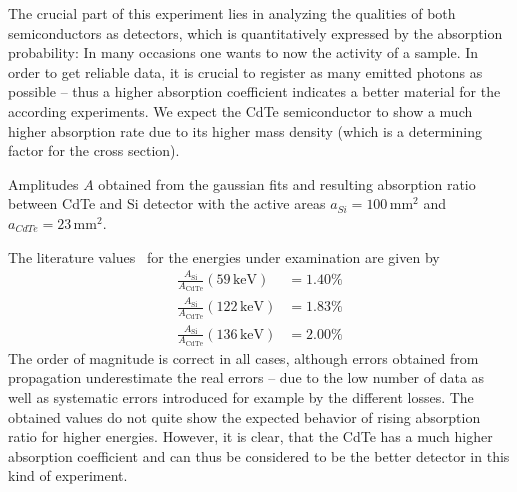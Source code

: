 The crucial part of this experiment lies in analyzing the qualities 
of both semiconductors as detectors, which is quantitatively expressed 
by the absorption probability: In many occasions one wants to now the 
activity of a sample. In order to get reliable data, it is crucial to 
register as many emitted photons as possible -- thus a higher absorption 
coefficient indicates a better material for the according experiments. 
We expect the CdTe semiconductor to show a much higher absorption rate 
due to its higher mass density (which is a determining factor for the 
    cross section). 
\begin{table}[htdp]
    \centering
    \caption{
        Amplitudes $A$ obtained from the gaussian fits and 
        resulting absorption ratio between CdTe and Si detector 
        with the active areas $a_{Si} = 100\, \mathrm{mm^2}$ and 
        $a_{CdTe} = 23\, \mathrm{mm^2}$.
        }
    
    \label{tab:detector_ratio}
\end{table}
The literature values~\cite{nist} for the energies under 
examination are given by 
\begin{align}
    \frac{A_\mathrm{Si}}{A_\mathrm{CdTe}}(59 \,\mathrm{keV}) &= 1.40 \% \\
    \frac{A_\mathrm{Si}}{A_\mathrm{CdTe}}(122 \,\mathrm{keV}) &= 1.83 \% \\
    \frac{A_\mathrm{Si}}{A_\mathrm{CdTe}}(136 \,\mathrm{keV}) &= 2.00 \%
\end{align}
The order of magnitude is correct in all cases, although 
errors obtained from propagation underestimate the 
real errors -- due to the low number of data as well as systematic 
errors introduced for example by the different losses. 
The obtained values do not quite show the expected behavior 
of rising absorption ratio for higher energies.
However, 
it is clear, that the CdTe has a much higher absorption coefficient and 
can thus be considered to be the better detector in this kind of 
experiment. 
